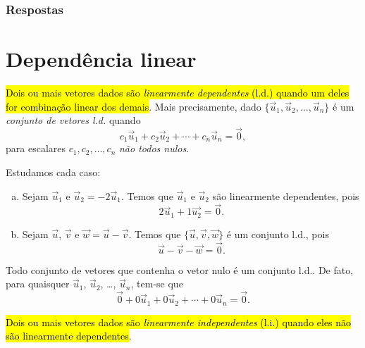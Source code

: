 \ifisbook
\subsubsection{Respostas}
\shipoutAnswer
\fi


\section{Dependência linear}\label{cap_base_sec_deplinear}
\badgeRevisar

\hl{Dois ou mais vetores dados são \emph{linearmente dependentes} (l.d.) quando um deles for combinação linear dos demais}. Mais precisamente, dado $\{\vec{u}_1, \vec{u}_2, \ldots, \vec{u}_n\}$ é um \emph{conjunto de vetores l.d.} quando
\begin{equation}
  c_1 \vec{u}_1 + c_2\vec{u}_2 + \cdots + c_n\vec{u}_n = \vec{0},
\end{equation}
para escalares $c_1, c_2, \ldots, c_n$ \emph{não todos nulos}.

\begin{ex}
  Estudamos cada caso:
  \begin{enumerate}[a)]
    \item Sejam $\vec{u}_1$ e $\vec{u}_2 = -2\vec{u}_1$. Temos que $\vec{u}_1$ e $\vec{u}_2$ são linearmente dependentes, pois
    \begin{equation}
    2\vec{u}_1 + 1\vec{u_2} = \vec{0}.
    \end{equation}
    \item Sejam $\vec{u}$, $\vec{v}$ e $\vec{w} = \vec{u} - \vec{v}$. Temos que $\{\vec{u}, \vec{v}, \vec{w}\}$ é um conjunto l.d., pois
    \begin{equation}
      \vec{u} - \vec{v} - \vec{w} = \vec{0}.
    \end{equation}
  \end{enumerate}
\end{ex}

\begin{obs}
  Todo conjunto de vetores que contenha o vetor nulo é um conjunto l.d.. De fato, para quaisquer $\vec{u}_1$, $\vec{u}_2$, \ldots, $\vec{u}_n$, tem-se que
  \begin{equation}
    \vec{0} + 0\vec{u}_1 + 0\vec{u}_2 + \cdots + 0\vec{u}_n = \vec{0}.
  \end{equation}
\end{obs}

\hl{Dois ou mais vetores dados são \emph{linearmente independentes} (l.i.) quando eles não são linearmente dependentes}.

